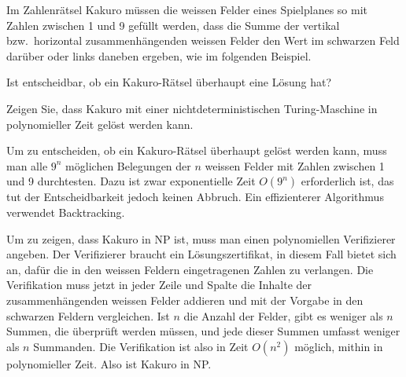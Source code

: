 Im Zahlenrätsel Kakuro müssen die weissen Felder eines Spielplanes
so mit Zahlen zwischen 1 und 9 gefüllt werden, dass die Summe der
vertikal bzw.~horizontal zusammenhängenden weissen Felder den Wert im
schwarzen Feld darüber oder links daneben ergeben, wie im folgenden
Beispiel. 
\begin{center}
\end{center}
\begin{teilaufgaben}
\item 
Ist entscheidbar, ob ein Kakuro-Rätsel überhaupt eine Lösung
hat?
\item
Zeigen Sie, dass Kakuro mit einer nichtdeterministischen Turing-Maschine
in polynomieller Zeit gelöst werden kann.
\end{teilaufgaben}


\begin{loesung}
\begin{teilaufgaben}
\item
Um zu entscheiden, ob ein Kakuro-Rätsel überhaupt gelöst werden
kann, muss man alle $9^n$ möglichen Belegungen der $n$ weissen
Felder mit Zahlen zwischen 1 und 9 durchtesten. Dazu ist zwar
exponentielle Zeit $O(9^n)$ erforderlich ist, das tut der Entscheidbarkeit
jedoch keinen Abbruch.
Ein effizienterer Algorithmus verwendet Backtracking.
\item
Um zu zeigen, dass Kakuro in NP ist, muss man einen polynomiellen
Verifizierer angeben. Der Verifizierer braucht ein Lösungszertifikat,
in diesem Fall bietet sich an, dafür die in den weissen Feldern eingetragenen
Zahlen zu verlangen. Die Verifikation muss jetzt in jeder Zeile und
Spalte die Inhalte der zusammenhängenden weissen Felder addieren und 
mit der Vorgabe in den schwarzen Feldern vergleichen. Ist $n$ die Anzahl
der Felder, gibt es weniger als $n$ Summen, die überprüft werden müssen,
und jede dieser Summen umfasst weniger als $n$ Summanden. Die Verifikation
ist also in Zeit $O(n^2)$ möglich, mithin in polynomieller Zeit.
Also ist Kakuro in NP.
\qedhere
\end{teilaufgaben}
\end{loesung}
